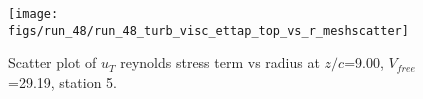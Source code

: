 \begin{figure}[H]
\centering
\texttt{[image: figs/run\_48/run\_48\_turb\_visc\_ettap\_top\_vs\_r\_meshscatter]}
\caption{Scatter plot of $
u_T$ reynolds stress term vs radius at $z/c$=9.00, $V_{free}$=29.19, station 5.}
\end{figure}


